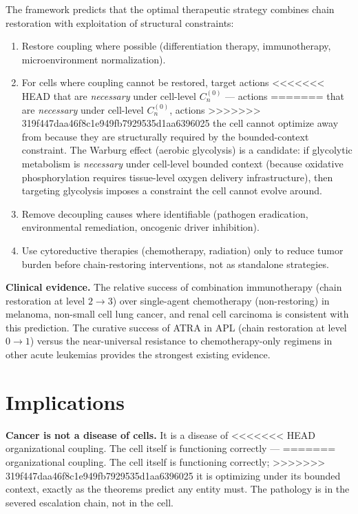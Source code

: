 \documentclass[11pt]{article}
\theoremstyle{definition}
\theoremstyle{remark}
\begin{document}
The framework predicts that the optimal therapeutic strategy combines
chain restoration with exploitation of structural constraints:
\begin{enumerate}
\item Restore coupling where possible (differentiation therapy,
   immunotherapy, microenvironment normalization).
\item For cells where coupling cannot be restored, target actions
<<<<<<< HEAD
   that are \emph{necessary} under cell-level $C_n^{(0)}$ --- actions
=======
   that are \emph{necessary} under cell-level $C_n^{(0)}$, actions
>>>>>>> 319f447daa46f8c1e949fb7929535d1aa6396025
   the cell cannot optimize away from because they are structurally
   required by the bounded-context constraint. The Warburg effect
   (aerobic glycolysis) is a candidate: if glycolytic metabolism is
   \emph{necessary} under cell-level bounded context (because
   oxidative phosphorylation requires tissue-level oxygen delivery
   infrastructure), then targeting glycolysis imposes a constraint
   the cell cannot evolve around.
\item Remove decoupling causes where identifiable (pathogen
   eradication, environmental remediation, oncogenic driver
   inhibition).
\item Use cytoreductive therapies (chemotherapy, radiation)
   only to reduce tumor burden before chain-restoring
   interventions, not as standalone strategies.
\end{enumerate}

\textbf{Clinical evidence.} The relative success of combination
immunotherapy (chain restoration at level $2 \to 3$) over
single-agent chemotherapy (non-restoring) in melanoma, non-small cell
lung cancer, and renal cell carcinoma is consistent with this
prediction. The curative success of ATRA in APL (chain restoration at
level $0 \to 1$) versus the near-universal resistance to
chemotherapy-only regimens in other acute leukemias provides the
strongest existing evidence.

\section{Implications}
\label{sec:implications}

\textbf{Cancer is not a disease of cells.} It is a disease of
<<<<<<< HEAD
organizational coupling. The cell itself is functioning correctly ---
=======
organizational coupling. The cell itself is functioning correctly;
>>>>>>> 319f447daa46f8c1e949fb7929535d1aa6396025
it is optimizing under its bounded context, exactly as the theorems
predict any entity must. The pathology is in the severed escalation
chain, not in the cell.
\end{document}
